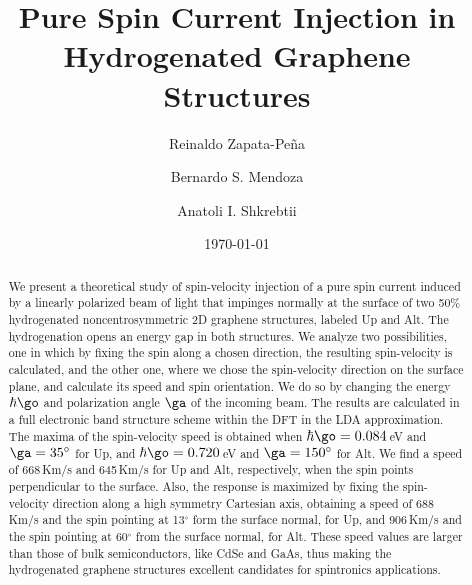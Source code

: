 \documentclass[floatfix,prb,aps,superscriptaddress,showpacs,11pt,preprint,letterpaper]{revtex4}
\begin{document}
\title{Pure Spin Current Injection in Hydrogenated Graphene Structures}
\author{Reinaldo Zapata-Pe\~na}
\author{Bernardo S. Mendoza}
\author{Anatoli I. Shkrebtii}

\date{\today}

\begin{abstract}
We present a theoretical study of spin-velocity injection of a pure
spin current induced by  a linearly
polarized beam of light that impinges normally at the surface of  two 50\%
hydrogenated noncentrosymmetric 2D graphene 
structures, labeled Up and Alt.
The hydrogenation opens an energy gap in both structures.
We analyze two possibilities, one in which by fixing the spin along a
chosen direction, the resulting spin-velocity is calculated, 
and the other one, where we chose the spin-velocity direction
on the surface plane, and calculate its speed and
spin orientation. We do so by changing the energy $\hbar\go$ 
and polarization angle $\ga$  of the incoming  beam. 
The results are calculated in a full
electronic band structure scheme within the DFT in the LDA approximation.
The maxima of the spin-velocity speed is obtained when
$\hbar\go=0.084$\,eV and $\ga=35^\circ$ for Up,
and
$\hbar\go=0.720$\,eV and $\ga=150^\circ$ for Alt.
We find a speed of
668\,Km/s
and 
645\,Km/s
for Up and Alt, respectively, when the spin points perpendicular to
the surface. Also,
the response is maximized
by fixing the spin-velocity direction along a high symmetry Cartesian axis,
obtaining a speed of 
688\,Km/s 
and the spin  pointing at 13$^\circ$ form the surface normal, for Up,
and
906\,Km/s 
and the spin pointing at 60$^\circ$ from the surface normal, for Alt.
These speed values are larger than those of bulk semiconductors, like
CdSe and GaAs, thus 
making the hydrogenated graphene structures
 excellent candidates for spintronics
applications.
\end{abstract}

\maketitle

\end{document}
